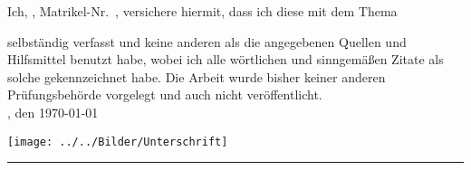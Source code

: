 \clearpage
{}
Ich, \autor, Matrikel-Nr.\ \matrikelnr, versichere hiermit, dass ich diese \art{} mit dem Thema
\begin{quote}
    \textit{\titel} \textit{\untertitel}
\end{quote}
selbständig verfasst und keine anderen als die angegebenen Quellen und Hilfsmittel benutzt habe, wobei ich alle
wörtlichen und sinngemäßen Zitate als solche gekennzeichnet habe. Die Arbeit wurde bisher keiner anderen
Prüfungsbehörde vorgelegt und auch nicht veröffentlicht.\\[6ex]

\ort, den \today

\texttt{[image: ../../Bilder/Unterschrift]}

\rule[-0.2cm]{5cm}{0.5pt}

\textsc{\autor} 